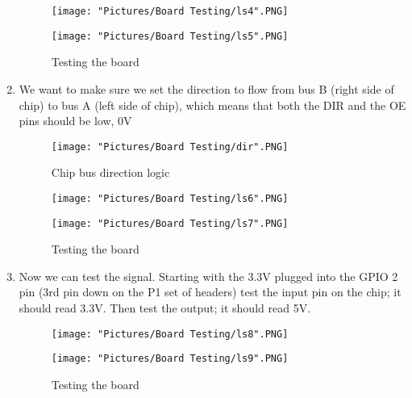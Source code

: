\documentclass[12pt]{article}
\begin{document}
\begin{enumerate}
\begin{figure}[H]
 	\centering
  	\begin{minipage}[b]{0.45\textwidth}
		\texttt{[image: "Pictures/Board Testing/ls4".PNG]}
  	\end{minipage}
  	\hfill
  	\begin{minipage}[b]{0.45\textwidth}
    		\texttt{[image: "Pictures/Board Testing/ls5".PNG]}
  	\end{minipage}
	\caption{Testing the board}
\end{figure}

	\item We want to make sure we set the direction to flow from bus B (right side of chip) to bus A (left side of chip), which means that both the DIR and the OE pins should be low, 0V

\begin{figure}[H]
  	\centering
    	\texttt{[image: "Pictures/Board Testing/dir".PNG]}
 	\caption{Chip bus direction logic}
	\label{dir}
\end{figure}

\begin{figure}[H]
 	\centering
  	\begin{minipage}[b]{0.45\textwidth}
		\texttt{[image: "Pictures/Board Testing/ls6".PNG]}
  	\end{minipage}
  	\hfill
  	\begin{minipage}[b]{0.45\textwidth}
    		\texttt{[image: "Pictures/Board Testing/ls7".PNG]}
  	\end{minipage}
	\caption{Testing the board}
\end{figure}

	\item Now we can test the signal. Starting with the 3.3V plugged into the GPIO 2 pin (3rd pin down on the P1 set of headers) test the input pin on the chip; it should read 3.3V. Then test the output; it should read 5V.

\begin{figure}[H]
 	\centering
  	\begin{minipage}[b]{0.45\textwidth}
		\texttt{[image: "Pictures/Board Testing/ls8".PNG]}
  	\end{minipage}
  	\hfill
  	\begin{minipage}[b]{0.45\textwidth}
    		\texttt{[image: "Pictures/Board Testing/ls9".PNG]}
  	\end{minipage}
	\caption{Testing the board}
	\label{ls2}
\end{figure}


\end{enumerate}
\end{document}

